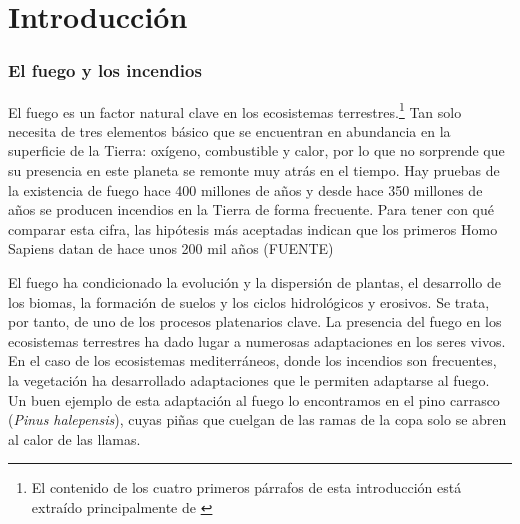 \documentclass[12pt,a4paper,]{book}
\title{}
\author{Nombre Completo Autor}
\date{18/11/2021}
\def\ifdoblecara{} %
\def\ifprincipal{} %
\let\ifprincipal\undefined %
\let\rmarkdownfootnote\footnote%
\def\footnote{\protect\rmarkdownfootnote}
\numberwithin{dummy}{section}
\theoremstyle{ocrenumbox}
\theoremstyle{blacknumex}
\theoremstyle{blacknumbox}
\theoremstyle{ocrenum}
\theoremstyle{ocrenum}
\begin{document}




\raggedbottom

\ifdefined\ifprincipal
\else
\setlength{\parindent}{1em}
\pagestyle{fancy}
\setcounter{tocdepth}{4}
\tableofcontents

\fi

\ifdefined\ifdoblecara
\fancyhead{}{}
\fancyhead[LE,RO]{\scriptsize\rightmark}
\fancyfoot[LO,RE]{\scriptsize\slshape \leftmark}
\fancyfoot[C]{}
\fancyfoot[LE,RO]{\footnotesize\thepage}
\else
\fancyhead{}{}
\fancyhead[RO]{\scriptsize\rightmark}
\fancyfoot[LO]{\scriptsize\slshape \leftmark}
\fancyfoot[C]{}
\fancyfoot[RO]{\footnotesize\thepage}
\fi

\renewcommand{\headrulewidth}{0.4pt}
\renewcommand{\footrulewidth}{0.4pt}

\hypertarget{introducciuxf3n}{%
\chapter{Introducción}\label{introducciuxf3n}}

\hypertarget{el-fuego-y-los-incendios}{%
\subsection*{El fuego y los incendios}\label{el-fuego-y-los-incendios}}

El fuego es un factor natural clave en los ecosistemas
terrestres.\footnote{El contenido de los cuatro primeros párrafos de
  esta introducción está extraído principalmente de \citet{MataixCerda}}
Tan solo necesita de tres elementos básico que se encuentran en
abundancia en la superficie de la Tierra: oxígeno, combustible y calor,
por lo que no sorprende que su presencia en este planeta se remonte muy
atrás en el tiempo. Hay pruebas de la existencia de fuego hace 400
millones de años y desde hace 350 millones de años se producen incendios
en la Tierra de forma frecuente. Para tener con qué comparar esta cifra,
las hipótesis más aceptadas indican que los primeros Homo Sapiens datan
de hace unos 200 mil años (FUENTE)

El fuego ha condicionado la evolución y la dispersión de plantas, el
desarrollo de los biomas, la formación de suelos y los ciclos
hidrológicos y erosivos. Se trata, por tanto, de uno de los procesos
platenarios clave. La presencia del fuego en los ecosistemas terrestres
ha dado lugar a numerosas adaptaciones en los seres vivos. En el caso de
los ecosistemas mediterráneos, donde los incendios son frecuentes, la
vegetación ha desarrollado adaptaciones que le permiten adaptarse al
fuego. Un buen ejemplo de esta adaptación al fuego lo encontramos en el
pino carrasco (\emph{Pinus halepensis}), cuyas piñas que cuelgan de las
ramas de la copa solo se abren al calor de las llamas.
\end{document}
